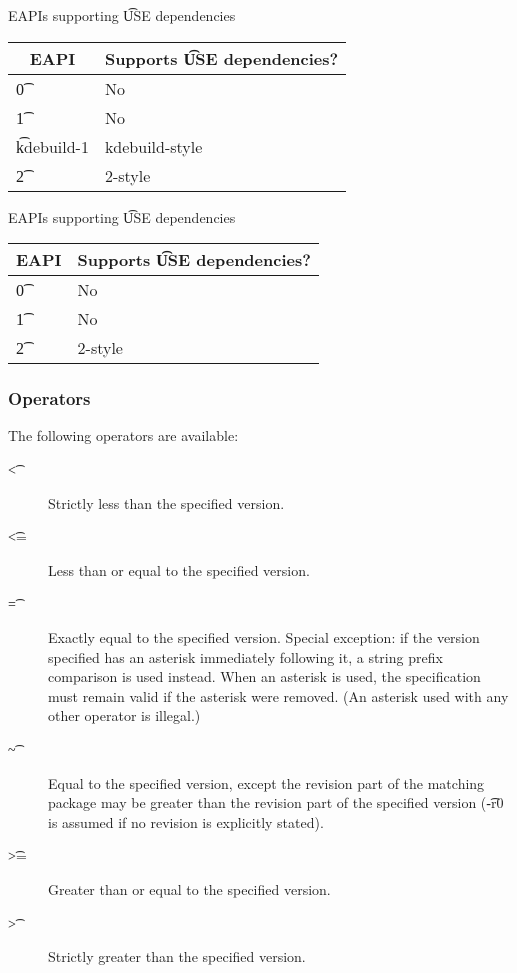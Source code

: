 \IFKDEBUILDELSE
{
    \begin{centertable}{EAPIs supporting \t{USE} dependencies} \label{use-deps-table}
    \begin{tabular}{ l l }
        \toprule
        \multicolumn{1}{c}{\textbf{EAPI}} &
        \multicolumn{1}{c}{\textbf{Supports \t{USE} dependencies?}} \\
        \midrule
    \t{0} & No \\
    \t{1} & No \\
    \t{kdebuild-1} & kdebuild-style \\
    \t{2} & 2-style \\
    \bottomrule
    \end{tabular}
    \end{centertable}
}{
    \begin{centertable}{EAPIs supporting \t{USE} dependencies} \label{use-deps-table}
    \begin{tabular}{ l l }
        \toprule
        \multicolumn{1}{c}{\textbf{EAPI}} &
        \multicolumn{1}{c}{\textbf{Supports \t{USE} dependencies?}} \\
        \midrule
    \t{0} & No \\
    \t{1} & No \\
    \t{2} & 2-style \\
    \bottomrule
    \end{tabular}
    \end{centertable}
}

\subsubsection{Operators}
\label{dep-operator}

The following operators are available:

\begin{description}
\item[\t{<}] Strictly less than the specified version.
\item[\t{<=}] Less than or equal to the specified version.
\item[\t{=}] Exactly equal to the specified version. Special exception: if the version
    specified has an asterisk immediately following it, a string prefix comparison is
    used instead. When an asterisk is used, the specification must remain valid if the
    asterisk were removed. (An asterisk used with any other operator is illegal.)
\item[\t{\textasciitilde}] Equal to the specified version, except the revision part of the matching
    package may be greater than the revision part of the specified version (\t{-r0} is
    assumed if no revision is explicitly stated).
\item[\t{>=}] Greater than or equal to the specified version.
\item[\t{>}] Strictly greater than the specified version.
\end{description}

